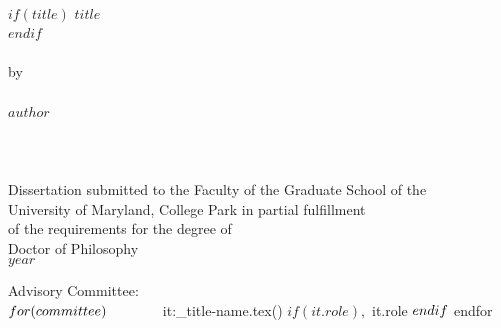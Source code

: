 
\thispagestyle{empty} \hbox{\ } \vspace{1.5in}
\renewcommand{\baselinestretch}{1}
\small\normalsize
\begin{center}

$if(title)$
\large{\uppercase{$title$}}\\
$endif$
\ \\ 
\ \\
\large{by} \\
\ \\
\large{$author$}
\ \\
\ \\
\ \\
\ \\
\normalsize
Dissertation submitted to the Faculty of the Graduate School of the \\
University of Maryland, College Park in partial fulfillment \\
of the requirements for the degree of \\
Doctor of Philosophy \\
$year$
\end{center}

\vspace{7.5em}

\noindent Advisory Committee: \\
${ for(committee) }
\hbox{\ }\hspace{.5in}${it:_title-name.tex() }${ if(it.role) }, ${ it.role }${ endif } \\
${ endfor } 

